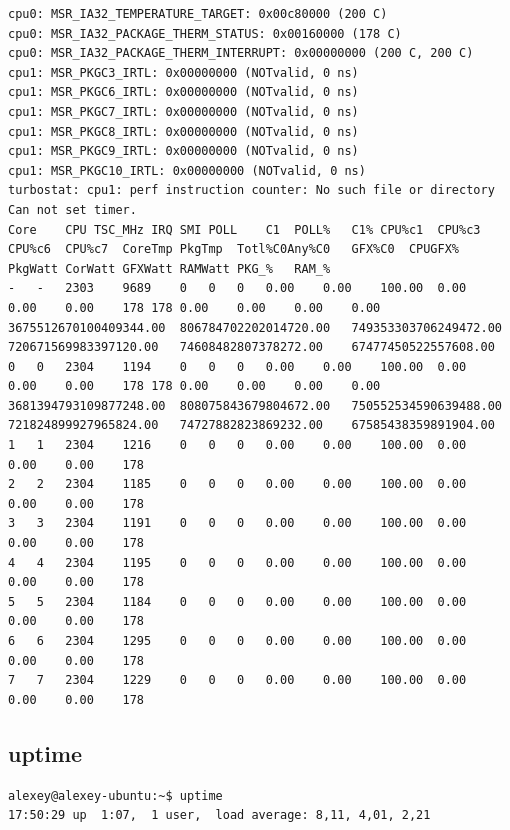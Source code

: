 \begin{verbatim}
cpu0: MSR_IA32_TEMPERATURE_TARGET: 0x00c80000 (200 C)
cpu0: MSR_IA32_PACKAGE_THERM_STATUS: 0x00160000 (178 C)
cpu0: MSR_IA32_PACKAGE_THERM_INTERRUPT: 0x00000000 (200 C, 200 C)
cpu1: MSR_PKGC3_IRTL: 0x00000000 (NOTvalid, 0 ns)
cpu1: MSR_PKGC6_IRTL: 0x00000000 (NOTvalid, 0 ns)
cpu1: MSR_PKGC7_IRTL: 0x00000000 (NOTvalid, 0 ns)
cpu1: MSR_PKGC8_IRTL: 0x00000000 (NOTvalid, 0 ns)
cpu1: MSR_PKGC9_IRTL: 0x00000000 (NOTvalid, 0 ns)
cpu1: MSR_PKGC10_IRTL: 0x00000000 (NOTvalid, 0 ns)
turbostat: cpu1: perf instruction counter: No such file or directory
Can not set timer.
Core	CPU	TSC_MHz	IRQ	SMI	POLL	C1	POLL%	C1%	CPU%c1	CPU%c3	CPU%c6	CPU%c7	CoreTmp	PkgTmp	Totl%C0Any%C0	GFX%C0	CPUGFX%	PkgWatt	CorWatt	GFXWatt	RAMWatt	PKG_%	RAM_%
-	-	2303	9689	0	0	0	0.00	0.00	100.00	0.00	0.00	0.00	178	178	0.00	0.00	0.00	0.00	3675512670100409344.00	806784702202014720.00	749353303706249472.00	720671569983397120.00	74608482807378272.00	67477450522557608.00
0	0	2304	1194	0	0	0	0.00	0.00	100.00	0.00	0.00	0.00	178	178	0.00	0.00	0.00	0.00	3681394793109877248.00	808075843679804672.00	750552534590639488.00	721824899927965824.00	74727882823869232.00	67585438359891904.00
1	1	2304	1216	0	0	0	0.00	0.00	100.00	0.00	0.00	0.00	178
2	2	2304	1185	0	0	0	0.00	0.00	100.00	0.00	0.00	0.00	178
3	3	2304	1191	0	0	0	0.00	0.00	100.00	0.00	0.00	0.00	178
4	4	2304	1195	0	0	0	0.00	0.00	100.00	0.00	0.00	0.00	178
5	5	2304	1184	0	0	0	0.00	0.00	100.00	0.00	0.00	0.00	178
6	6	2304	1295	0	0	0	0.00	0.00	100.00	0.00	0.00	0.00	178
7	7	2304	1229	0	0	0	0.00	0.00	100.00	0.00	0.00	0.00	178
\end{verbatim}
\subsection{uptime}
\begin{verbatim}
alexey@alexey-ubuntu:~$ uptime
17:50:29 up  1:07,  1 user,  load average: 8,11, 4,01, 2,21
\end{verbatim}
